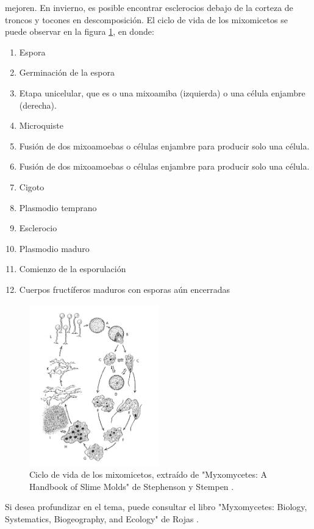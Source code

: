         mejoren. En invierno, es posible encontrar esclerocios debajo de la corteza de troncos y tocones en descomposici\'on.
    \vskip 0.5cm
    El ciclo de vida de los mixomicetos se puede observar en la figura \ref{fig:MixomicetoCicloVida}, en donde: 
    \renewcommand{\labelenumi}{{\Alph{enumi}})} 
    \begin{enumerate}
        \item Espora 
        \item Germinaci\'on de la espora
        \item Etapa unicelular, que es o una mixoamiba (izquierda) o una c\'elula enjambre (derecha).
        \item Microquiste
        \item Fusi\'on de dos mixoamoebas o c\'elulas enjambre para producir solo una c\'elula.
        \item Fusi\'on de dos mixoamoebas o c\'elulas enjambre para producir solo una c\'elula.
        \item Cigoto
        \item Plasmodio temprano
        \item Esclerocio 
        \item Plasmodio maduro
        \item Comienzo de la esporulaci\'on 
        \item Cuerpos fruct\'iferos maduros con esporas a\'un encerradas
    \end{enumerate}
    \begin{figure}[h]
        \centering
        \includegraphics[width=0.5\textwidth]{./images/marco_teorico/Physarum/mixomiceto_ciclo_vida.png}
        \caption{Ciclo de vida de los mixomicetos, extra\'ido de "Myxomycetes: A Handbook of Slime Molds" de Stephenson y Stempen \cite{Stephenson1994}.}
        \label{fig:MixomicetoCicloVida}
    \end{figure}
    \vskip 0.5cm
    Si desea profundizar en el tema, puede consultar el libro "Myxomycetes: Biology, Systematics, Biogeography, and Ecology" de Rojas \cite{Rojas2017}.
    \vskip 0.5cm
    \clearpage